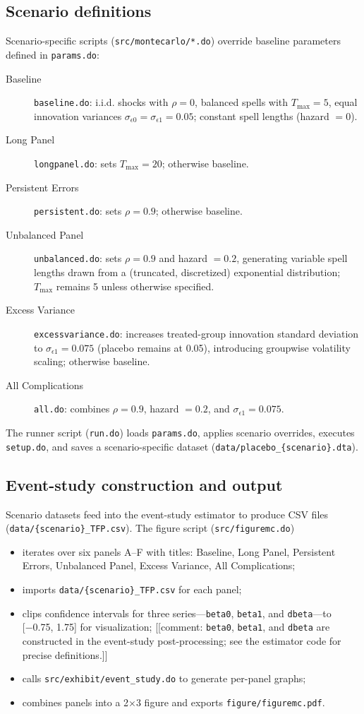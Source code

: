 \documentclass[11pt,a4paper]{article}
\begin{document}
\subsection{Scenario definitions}
Scenario-specific scripts (\texttt{src/montecarlo/*.do}) override baseline parameters defined in \texttt{params.do}:
\begin{description}
 \item[Baseline] \texttt{baseline.do}: i.i.d. shocks with $\rho=0$, balanced spells with $T_{\max}=5$, equal innovation variances $\sigma_{\epsilon0}=\sigma_{\epsilon1}=0.05$; constant spell lengths (hazard $=0$).
 \item[Long Panel] \texttt{longpanel.do}: sets $T_{\max}=20$; otherwise baseline.
 \item[Persistent Errors] \texttt{persistent.do}: sets $\rho=0.9$; otherwise baseline.
 \item[Unbalanced Panel] \texttt{unbalanced.do}: sets $\rho=0.9$ and hazard $=0.2$, generating variable spell lengths drawn from a (truncated, discretized) exponential distribution; $T_{\max}$ remains 5 unless otherwise specified.
 \item[Excess Variance] \texttt{excessvariance.do}: increases treated-group innovation standard deviation to $\sigma_{\epsilon1}=0.075$ (placebo remains at 0.05), introducing groupwise volatility scaling; otherwise baseline.
 \item[All Complications] \texttt{all.do}: combines $\rho=0.9$, hazard $=0.2$, and $\sigma_{\epsilon1}=0.075$.
\end{description}
The runner script (\texttt{run.do}) loads \texttt{params.do}, applies scenario overrides, executes \texttt{setup.do}, and saves a scenario-specific dataset (\texttt{data/placebo\_\{scenario\}.dta}).

\subsection{Event-study construction and output}
Scenario datasets feed into the event-study estimator to produce CSV files (\texttt{data/\{scenario\}\_TFP.csv}). The figure script (\texttt{src/figuremc.do})
\begin{itemize}
 \item iterates over six panels A--F with titles: Baseline, Long Panel, Persistent Errors, Unbalanced Panel, Excess Variance, All Complications;
 \item imports \texttt{data/\{scenario\}\_TFP.csv} for each panel;
 \item clips confidence intervals for three series—\texttt{beta0}, \texttt{beta1}, and \texttt{dbeta}—to [−0.75, 1.75] for visualization; [[comment: \texttt{beta0}, \texttt{beta1}, and \texttt{dbeta} are constructed in the event-study post-processing; see the estimator code for precise definitions.]]
 \item calls \texttt{src/exhibit/event\_study.do} to generate per-panel graphs;
 \item combines panels into a 2×3 figure and exports \texttt{figure/figuremc.pdf}.
\end{itemize}
\end{document}
